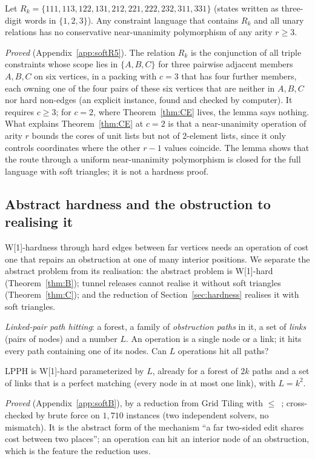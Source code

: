 \begin{lemma}\label{lem:R5}
Let $R_k=\{111,113,122,131,212,221,222,232,311,331\}$ (states written as three-digit words in $\{1,2,3\}$). Any constraint language that contains $R_k$ and all unary relations has no conservative near-unanimity polymorphism of any arity $r\ge3$.
\end{lemma}
\emph{Proved} (Appendix~\ref{app:softR5}). The relation $R_k$ is the conjunction of all triple constraints whose scope lies in $\{A,B,C\}$ for three pairwise adjacent members $A,B,C$ on six vertices, in a packing with $c=3$ that has four further members, each owning one of the four pairs of these six vertices that are neither in $A,B,C$ nor hard non-edges (an explicit instance, found and checked by computer). It requires $c\ge3$; for $c=2$, where Theorem~\ref{thm:CE} lives, the lemma says nothing. What explains Theorem~\ref{thm:CE} at $c=2$ is that a near-unanimity operation of arity $r$ bounds the cores of unit lists but not of $2$-element lists, since it only controls coordinates where the other $r-1$ values coincide. The lemma shows that the route through a uniform near-unanimity polymorphism is closed for the full language with soft triangles; it is not a hardness proof.

\subsection{Abstract hardness and the obstruction to realising it}\label{sec:softhard}
W[1]-hardness through hard edges between far vertices needs an operation of cost one that repairs an obstruction at one of many interior positions. We separate the abstract problem from its realisation: the abstract problem is W[1]-hard (Theorem~\ref{thm:B}); tunnel releases cannot realise it without soft triangles (Theorem~\ref{thm:C}); and the reduction of Section~\ref{sec:hardness} realises it with soft triangles.
\begin{definition}[LPPH]
\emph{Linked-pair path hitting}: a forest, a family of \emph{obstruction paths} in it, a set of \emph{links} (pairs of nodes) and a number $L$. An operation is a single node or a link; it hits every path containing one of its nodes. Can $L$ operations hit all paths?
\end{definition}
\begin{theorem}\label{thm:B}
LPPH is W[1]-hard parameterized by $L$, already for a forest of $2k$ paths and a set of links that is a perfect matching (every node in at most one link), with $L=k^2$.
\end{theorem}
\emph{Proved} (Appendix~\ref{app:softB}), by a reduction from Grid Tiling with $\le$~\cite{Cygan15}; cross-checked by brute force on $1{,}710$ instances (two independent solvers, no mismatch). It is the abstract form of the mechanism ``a far two-sided edit shares cost between two places''; an operation can hit an interior node of an obstruction, which is the feature the reduction uses.

